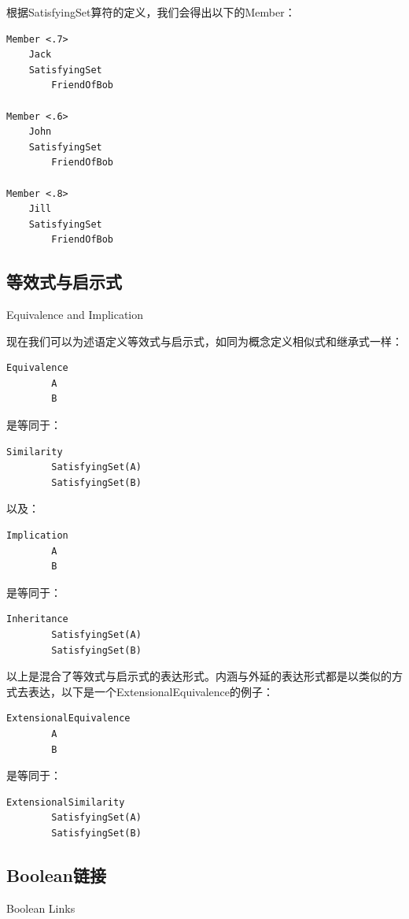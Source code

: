 根据SatisfyingSet算符的定义，我们会得出以下的Member：

\begin{verbatim}
Member <.7>
	Jack
	SatisfyingSet
		FriendOfBob

Member <.6>
	John
	SatisfyingSet
		FriendOfBob

Member <.8>
	Jill
	SatisfyingSet
		FriendOfBob
\end{verbatim}

\subsection{等效式与启示式}{Equivalence and Implication}

现在我们可以为述语定义等效式与启示式，如同为概念定义相似式和继承式一样：

\begin{verbatim}
Equivalence
        A
        B
\end{verbatim}

是等同于：

\begin{verbatim}
Similarity
        SatisfyingSet(A)
        SatisfyingSet(B)
\end{verbatim}

以及：

\begin{verbatim}
Implication
        A
        B
\end{verbatim}

是等同于：

\begin{verbatim}
Inheritance
        SatisfyingSet(A)
        SatisfyingSet(B)
\end{verbatim}

以上是混合了等效式与启示式的表达形式。内涵与外延的表达形式都是以类似的方式去表达，以下是一个ExtensionalEquivalence的例子：

\begin{verbatim}
ExtensionalEquivalence
        A
        B
\end{verbatim}

是等同于：

\begin{verbatim}
ExtensionalSimilarity
        SatisfyingSet(A)
        SatisfyingSet(B)
\end{verbatim}

\subsection{Boolean链接}{Boolean Links}


